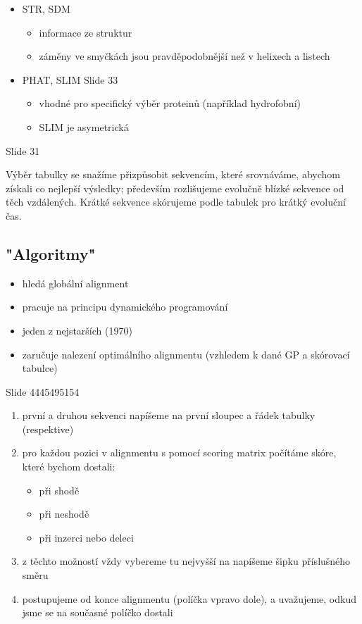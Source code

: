 \documentclass[DIV=8]{scrreprt}
\begin{document}
\begin{itemize}
    \item STR, SDM
\begin{itemize}
    \item informace ze struktur
    \item záměny ve smyčkách jsou pravděpodobnější než v helixech a listech
\end{itemize}

    \item PHAT, SLIM Slide 33
\begin{itemize}
    \item vhodné pro specifický výběr proteinů (například hydrofobní)
    \item SLIM je asymetrická
\end{itemize}

\end{itemize}


Slide 31

Výběr tabulky se snažíme přizpůsobit sekvencím, které srovnáváme, abychom získali co nejlepší výsledky; především rozlišujeme evolučně blízké sekvence od těch vzdálených. Krátké sekvence skórujeme podle tabulek pro krátký evoluční čas.

\subsection{"Algoritmy"}

\begin{itemize}
    \item hledá globální alignment
    \item pracuje na principu dynamického programování
    \item jeden z nejstarších (1970)
    \item zaručuje nalezení optimálního alignmentu (vzhledem k dané GP a skórovací tabulce)
\end{itemize}


Slide 4445495154
\begin{enumerate}
    \item první a druhou sekvenci napíšeme na první sloupec a řádek tabulky (respektive)
    \item pro každou pozici v alignmentu s pomocí scoring matrix počítáme skóre, které bychom dostali:
\begin{itemize}
    \item při shodě
    \item při neshodě
    \item při inzerci nebo deleci
\end{itemize}

    \item z těchto možností vždy vybereme tu nejvyšší na napíšeme šipku příslušného směru
    \item postupujeme od konce alignmentu (políčka vpravo dole), a uvažujeme, odkud jsme se na současné políčko dostali
\end{enumerate}
\end{document}

